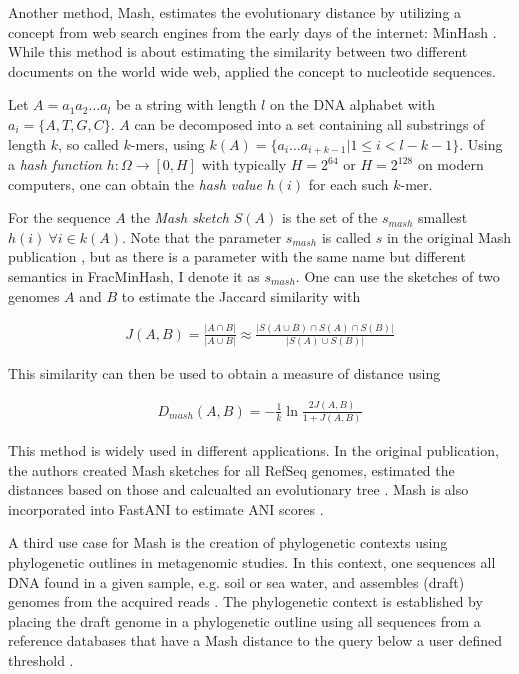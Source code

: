 Another method, Mash, estimates the evolutionary distance by utilizing a concept
from web search engines from the early days of the internet: MinHash
\cite{broderResemblanceContainmentDocuments1998a,ondovMashFastGenome2016}. While
this method is about estimating the similarity between two different documents
on the world wide web,  applied the concept
to nucleotide sequences.

Let $A = a_1 a_2 \dots a_l$ be a string with length $l$ on the DNA alphabet with
$a_i = \{A, T, G, C\}$. $A$ can be decomposed into a set containing all
substrings of length $k$, so called $k$-mers, using $k(A) = \{a_i \dots
a_{i+k-1} | 1 \leq i < l-k-1\}$. Using a \textit{hash function} $h: \Omega
\rightarrow [0, H]$ with typically $H=2^{64}$ or $H=2^{128}$ on modern
computers, one can obtain the \textit{hash value} $h(i)$ for each such $k$-mer.

For the sequence $A$ the \textit{Mash sketch} $S(A)$ is the set of the
$s_{mash}$ smallest $h(i) ~ \forall i \in k(A)$. Note that the parameter
$s_{mash}$ is called $s$ in the original Mash publication
\cite{ondovMashFastGenome2016}, but as there is a parameter  with the same name
but different semantics in FracMinHash, I denote it as $s_{mash}$. One can use
the sketches of two genomes $A$ and $B$ to estimate the Jaccard similarity with 

\begin{align}
  J(A, B) = \frac{|A \cap B|}{|A \cup B|} \approx \frac{|S(A \cup B) \cap S(A) \cap S(B)|}{|S(A) \cup S(B)|}
\end{align}

This similarity can then be used to obtain a measure of distance using

\begin{align}
  D_{mash}(A,B) = -\frac{1}{k}\ln{\frac{2J(A,B)}{1+J(A,B)}}
\end{align}

This method is widely used in different applications. In the original
publication, the authors created Mash sketches for all RefSeq genomes, estimated
the distances based on those and calcualted an evolutionary tree
\cite{ondovMashFastGenome2016}. Mash is also incorporated into FastANI to
estimate ANI scores \cite{jainHighThroughputANI2018}.

A third use case for Mash is the creation of phylogenetic contexts using
phylogenetic outlines \cite{bagciMicrobialPhylogeneticContext2021} in
metagenomic studies. In this context, one sequences all DNA found in a given
sample, e.g. soil or sea water, and assembles (draft) genomes from the acquired
reads \cite{kuninBioinformaticianGuideMetagenomics2008}. The phylogenetic
context is established by placing the draft genome in a phylogenetic outline
using all sequences from a reference databases that have a Mash distance to the
query below a user defined threshold
\cite{bagciMicrobialPhylogeneticContext2021}.

